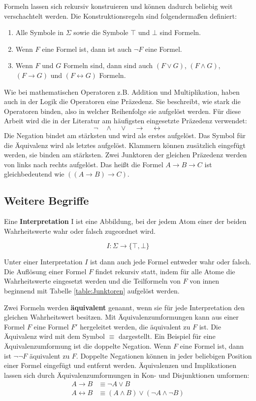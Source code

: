 Formeln lassen sich rekursiv konstruieren und können dadurch beliebig weit verschachtelt werden. Die Konstruktionsregeln sind folgendermaßen definiert:
\begin{enumerate}
	\item Alle Symbole in $\Sigma$ sowie die Symbole $\top$ und $\bot$ sind Formeln.
	\item Wenn $F$ eine Formel ist, dann ist auch $\neg F$ eine Formel.
	\item Wenn $F$ und $G$ Formeln sind, dann sind auch $(F \vee G)$, $(F \wedge G)$, $(F \to G)$ und $(F \leftrightarrow G)$ Formeln.
\end{enumerate}
Wie bei mathematischen Operatoren z.B. Addition und Multiplikation, haben auch in der Logik die Operatoren eine Präzedenz. Sie beschreibt, wie stark die Operatoren binden, also in welcher Reihenfolge sie aufgelöst werden. Für diese Arbeit wird die in der Literatur am häufigsten eingesetzte Präzedenz verwendet:
$$\neg \quad \wedge \quad \vee \quad \to \quad \leftrightarrow$$
Die Negation bindet am stärksten und wird als erstes aufgelöst. Das Symbol für die Äquivalenz wird als letztes aufgelöst. Klammern können zusätzlich eingefügt werden, sie binden am stärksten.
Zwei Junktoren der gleichen Präzedenz werden von links nach rechts aufgelöst. Das heißt die Formel $A\to B\to C$ ist gleichbedeutend wie $((A\to B)\to C)$.

\subsection{Weitere Begriffe}

Eine \textbf{Interpretation} I ist eine Abbildung, bei der jedem Atom einer der beiden Wahrheitswerte wahr oder falsch zugeordnet wird. 

$$I: \Sigma\to\{\top,\bot\}$$

Unter einer Interpretation $I$ ist dann auch jede Formel entweder wahr oder falsch. Die Auflösung einer Formel $F$ findet rekursiv statt, indem für alle Atome die Wahrheitswerte eingesetzt werden und die Teilformeln von $F$ von innen beginnend mit Tabelle \ref{table:Junktoren} aufgelöst werden.

Zwei Formeln werden \textbf{äquivalent} genannt, wenn sie für jede Interpretation den gleichen Wahrheitswert besitzen. Mit Äquivalenzumformungen kann aus einer Formel $F$ eine Formel $F'$ hergeleitet werden, die äquivalent zu $F$ ist. Die Äquivalenz wird mit dem Symbol $\equiv$ dargestellt. Ein Beispiel für eine Äquivalenzumformung ist die doppelte Negation. Wenn $F$ eine Formel ist, dann ist $\neg\neg F$ äquivalent zu $F$. Doppelte Negationen können in jeder beliebigen Position einer Formel eingefügt und entfernt werden. Äquivalenzen und Implikationen lassen sich durch Äquivalenzumformungen in Kon- und Disjunktionen umformen:
\begin{align*}
	A \to B &\equiv \neg A \vee B \\
	A \leftrightarrow B &\equiv (A \wedge B) \vee (\neg A \wedge \neg B)	
\end{align*}

